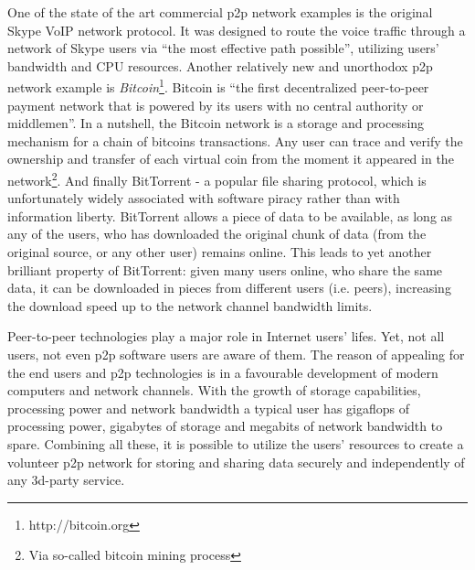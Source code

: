 One of the state of the art commercial p2p network examples is the
original Skype VoIP network protocol. It was designed to route the
voice traffic through a network of Skype users via
``the most effective path possible''\cite{skype-p2p}, utilizing
users' bandwidth and CPU resources.
Another relatively new and unorthodox p2p network example is
\emph{Bitcoin}\footnote{http://bitcoin.org}. Bitcoin is
``the first decentralized peer-to-peer payment network that
is powered by its users with no central authority or middlemen''.
In a nutshell, the Bitcoin network is a storage and processing
mechanism for a chain of bitcoins transactions. Any user can
trace and verify the ownership and transfer of each virtual
coin from the moment it appeared in the network\footnote{Via
so-called bitcoin mining process}.
And finally BitTorrent - a popular file sharing protocol, which is
unfortunately widely associated with software piracy rather than
with information liberty. BitTorrent allows a piece of data to be
available, as long as any of the users, who has downloaded the original
chunk of data (from the original source, or any other user) remains
online. This leads to yet another brilliant property of BitTorrent:
given many users online, who share the same data, it can be downloaded
in pieces from different users (i.e. peers), increasing the download
speed up to the network channel bandwidth limits.

Peer-to-peer technologies play a major role in Internet users' lifes.
Yet, not all users, not even p2p software users are aware of them.
The reason of appealing for the end users and p2p technologies
is in a favourable development of modern computers and network channels.
With the growth of storage capabilities, processing power and network
bandwidth a typical user has gigaflops of processing power, gigabytes
of storage and megabits of network bandwidth to spare. Combining all
these, it is possible to utilize the users' resources to create a
volunteer p2p network for storing and sharing data securely and
independently of any 3d-party service.


